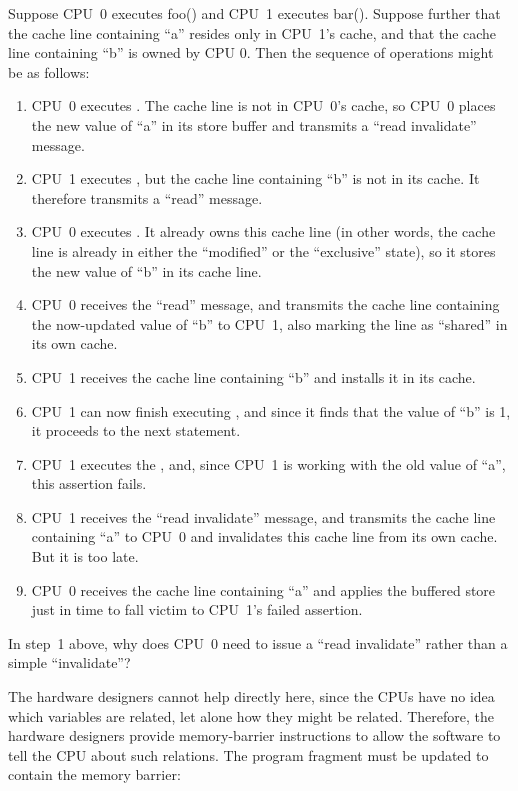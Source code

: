 Suppose CPU~0 executes foo() and CPU~1 executes bar().
Suppose further that the cache line containing ``a'' resides only in CPU~1's
cache, and that the cache line containing ``b'' is owned by CPU 0.
Then the sequence of operations might be as follows:
\begin{enumerate}
\item	CPU~0 executes .  The cache line is not in
	CPU~0's cache, so CPU~0 places the new value of ``a'' in its
	store buffer and transmits a ``read invalidate'' message.
\item	CPU~1 executes , but the cache line
	containing ``b'' is not in its cache.
	It therefore transmits a ``read'' message.
\item	CPU~0 executes .
	It already owns this cache line (in other words, the cache line
	is already in either the ``modified'' or the ``exclusive'' state),
	so it stores the new value of ``b'' in its cache line.
\item	CPU~0 receives the ``read'' message, and transmits the
	cache line containing the now-updated value of ``b''
	to CPU~1, also marking the line as ``shared'' in its own cache.
\item	CPU~1 receives the cache line containing ``b'' and installs
	it in its cache.
\item	CPU~1 can now finish executing ,
	and since it finds that the value of ``b'' is 1, it proceeds
	to the next statement.
\item	CPU~1 executes the , and, since CPU~1 is
	working with the old value of ``a'', this assertion fails.
\item	CPU~1 receives the ``read invalidate'' message, and
	transmits the cache line containing ``a'' to CPU~0 and
	invalidates this cache line from its own cache.
	But it is too late.
\item	CPU~0 receives the cache line containing ``a'' and applies
	the buffered store just in time to fall victim to CPU~1's
	failed assertion.
\end{enumerate}

\QuickQuiz{}
	In step~1 above, why does CPU~0 need to issue a ``read invalidate''
	rather than a simple ``invalidate''?
 \QuickQuizEnd

The hardware designers cannot help directly here, since the CPUs have
no idea which variables are related, let alone how they might be related.
Therefore, the hardware designers provide memory-barrier instructions
to allow the software to tell the CPU about such relations.
The program fragment must be updated to contain the memory barrier:

